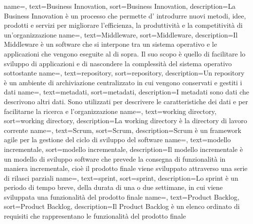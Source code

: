 {
    name=,
    text=Business Innovation,
    sort=Business Innovation,
    description={La Business Innovation è un processo che permette d' introdurre nuovi metodi, idee, prodotti e servizi per migliorare l'efficienza, la produttività e la competitività di un'organizzazione}
}
{
    name=,
    text=Middleware,
    sort=Middleware,
    description={Il Middleware è un software che si interpone tra un sistema operativo e le applicazioni che vengono eseguite al di sopra. Il suo scopo è quello di facilitare lo sviluppo di applicazioni e di nascondere la complessità del sistema operativo sottostante}
}
{
    name=,
    text=repository,
    sort=repository,
    description={Un repository è un ambiente di archiviazione centralizzato in cui vengono conservati e gestiti i dati}
}
{
    name=,
    text=metadati,
    sort=metadati,
    description={I metadati sono dati che descrivono altri dati. Sono utilizzati per descrivere le caratteristiche dei dati e per facilitarne la ricerca e l'organizzazione}
}
{
    name=,
    text=working directory,
    sort=working directory,
    description={La working directory è la directory di lavoro corrente}
}
{
    name=,
    text=Scrum,
    sort=Scrum,
    description={Scrum è un framework agile per la gestione del ciclo di sviluppo del software}
}
{
    name=,
    text=modello incrementale,
    sort=modello incrementale,
    description={Il modello incrementale è un modello di sviluppo software che prevede la consegna di funzionalità in maniera incrementale, cioè il prodotto finale viene 
    sviluppato attraverso una serie di rilasci parziali}
}
{
    name=,
    text=sprint,
    sort=sprint,
    description={Lo sprint è un periodo di tempo breve, della durata di una o due settimane, in cui viene sviluppata 
    una funzionalità del prodotto finale}
}
{
    name=,
    text=Product Backlog,
    sort=Product Backlog,
    description={Il Product Backlog è un elenco ordinato di requisiti che rappresentano le funzionalità del prodotto finale}
}
